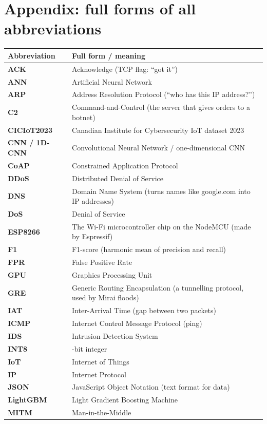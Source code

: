 \documentclass[11pt]{article}
\begin{document}
\section*{Appendix: full forms of all abbreviations}
\begin{longtable}{@{}>{\bfseries}l >{\raggedright\arraybackslash}p{12.5cm}@{}}
\toprule
Abbreviation & Full form / meaning \\
\midrule
\endhead
ACK & Acknowledge (TCP flag: ``got it'') \\
ANN & Artificial Neural Network \\
ARP & Address Resolution Protocol (``who has this IP address?'') \\
C2 & Command-and-Control (the server that gives orders to a botnet) \\
CICIoT2023 & Canadian Institute for Cybersecurity IoT dataset 2023 \\
CNN / 1D-CNN & Convolutional Neural Network / one-dimensional CNN \\
CoAP & Constrained Application Protocol \\
DDoS & Distributed Denial of Service \\
DNS & Domain Name System (turns names like google.com into IP addresses) \\
DoS & Denial of Service \\
ESP8266 & The Wi-Fi microcontroller chip on the NodeMCU (made by Espressif) \\
F1 & F1-score (harmonic mean of precision and recall) \\
FPR & False Positive Rate \\
GPU & Graphics Processing Unit \\
GRE & Generic Routing Encapsulation (a tunnelling protocol, used by Mirai floods) \\
IAT & Inter-Arrival Time (gap between two packets) \\
ICMP & Internet Control Message Protocol (ping) \\
IDS & Intrusion Detection System \\
INT8 & 8-bit integer \\
IoT & Internet of Things \\
IP & Internet Protocol \\
JSON & JavaScript Object Notation (text format for data) \\
LightGBM & Light Gradient Boosting Machine \\
MITM & Man-in-the-Middle \\

\end{longtable}
\end{document}
